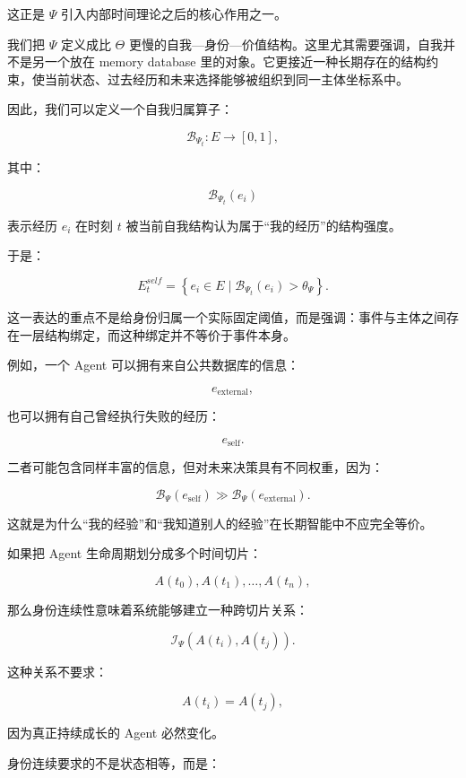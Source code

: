 \begin{statementbox}
\centering
{}
\end{statementbox}

这正是 $\Psi$ 引入内部时间理论之后的核心作用之一。

我们把 $\Psi$ 定义成比 $\Theta$ 更慢的自我—身份—价值结构。这里尤其需要强调，自我并不是另一个放在 memory database 里的对象。它更接近一种长期存在的结构约束，使当前状态、过去经历和未来选择能够被组织到同一主体坐标系中。

因此，我们可以定义一个自我归属算子：

\[
\mathcal{B}_{\Psi_t}
:
E
\rightarrow
[0,1],
\]

其中：

\[
\mathcal{B}_{\Psi_t}(e_i)
\]

表示经历 $e_i$ 在时刻 $t$ 被当前自我结构认为属于“我的经历”的结构强度。

于是：

\[
E^{self}_t
=
\left\{
e_i
\in E
\mid
\mathcal{B}_{\Psi_t}(e_i)>\theta_{\Psi}
\right\}.
\]

这一表达的重点不是给身份归属一个实际固定阈值，而是强调：事件与主体之间存在一层结构绑定，而这种绑定并不等价于事件本身。

例如，一个 Agent 可以拥有来自公共数据库的信息：

\[
e_{\mathrm{external}},
\]

也可以拥有自己曾经执行失败的经历：

\[
e_{\mathrm{self}}.
\]

二者可能包含同样丰富的信息，但对未来决策具有不同权重，因为：

\[
\mathcal{B}_{\Psi}(e_{\mathrm{self}})
\gg
\mathcal{B}_{\Psi}(e_{\mathrm{external}}).
\]

这就是为什么“我的经验”和“我知道别人的经验”在长期智能中不应完全等价。

如果把 Agent 生命周期划分成多个时间切片：

\[
A(t_0),
A(t_1),
\ldots,
A(t_n),
\]

那么身份连续性意味着系统能够建立一种跨切片关系：

\[
\mathcal{I}_{\Psi}
\left(
A(t_i),
A(t_j)
\right).
\]

这种关系不要求：

\[
A(t_i)=A(t_j),
\]

因为真正持续成长的 Agent 必然变化。

身份连续要求的不是状态相等，而是：

